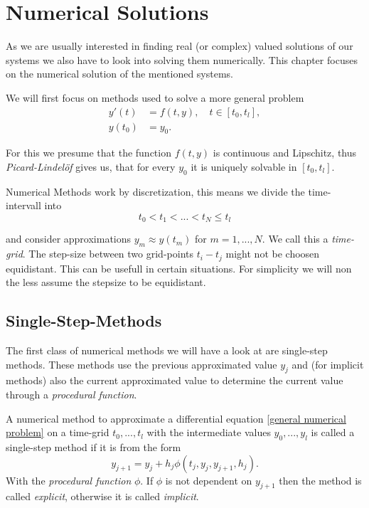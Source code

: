 \chapter{Numerical Solutions}
As we are usually interested in finding real (or complex) valued solutions of our systems we also have to look into solving them numerically. This chapter focuses on the numerical solution of the mentioned systems.

We will first focus on methods used to solve a more general problem
\begin{align}
	\label{general numerical problem}
	y'(t) &= f(t,y), \quad t \in [t_0, t_l], \\
	y(t_0) &= y_0.
\end{align}


For this we presume that the function $f(t,y)$ is continuous and Lipschitz, thus \emph{Picard-Lindelöf} gives us, that for every $y_0$ it is uniquely solvable in $[t_0, t_l]$.

Numerical Methods work by discretization, this means we divide the time-intervall into
\begin{displaymath}
	t_0 < t_1 < ... < t_N \leq t_l
\end{displaymath}

and consider approximations $y_m \approx y(t_m)$ for $m=1,...,N$. We call this a \emph{time-grid}. The step-size between two grid-points $t_i - t_j$ might not be choosen equidistant. This can be usefull in certain situations. For simplicity we will non the less assume the stepsize to be equidistant.

\section{Single-Step-Methods}
	The first class of numerical methods we will have a look at are single-step methods. These methods use the previous approximated value $y_j$ and (for implicit methods) also the current approximated value to determine the current value through a \emph{procedural function}.
	
	\begin{definition}
		A numerical method to approximate a differential equation \ref{general numerical problem} on a time-grid $t_0,...,t_l$ with the intermediate values $y_0,...,y_l$ is called a single-step method if it is from the form
		\begin{equation}
			\label{single-step method}
			y_{j+1} = y_j + h_j \phi(t_j,y_j, y_{j+1},h_j).
		\end{equation}
		With the \emph{procedural function} $\phi$. If $\phi$ is not dependent on $y_{j+1}$ then the method is called \emph{explicit}, otherwise it is called \emph{implicit}.
	\end{definition}

